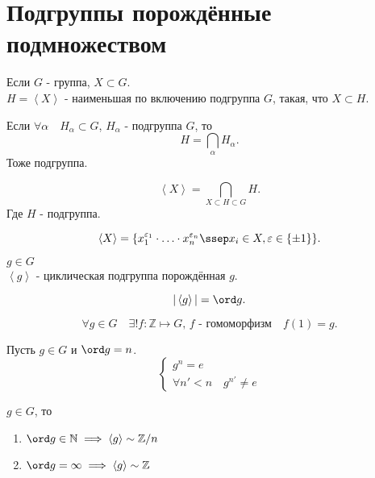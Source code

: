 \documentclass[11pt, oneside]{article}   	%
\begin{document}
\section{Подгруппы порождённые подмножеством}
    \begin{definition}
        Если $G$ - группа, $X \subset G$.\\
        $H = \left<X\right>$ - наименьшая по включению подгруппа $G$, такая, что $X \subset H$. 
    \end{definition}
    \begin{dlemma}
        Если $\forall{\alpha}\quad H_{\alpha} \subset G$, $H_{\alpha}$ - подгруппа $G$, то 
        \[ H = \bigcap_{\alpha} H_{\alpha}  .\]
        Тоже подгруппа.
    \end{dlemma}
    \begin{dlemma}
        \[ \left<X\right> = \bigcap_{X \subset H \subset G} H .\]
        Где $H$ - подгруппа.
    \end{dlemma}
    \begin{dlemma}
        \[ \left<X\right> = \{x_1^{\varepsilon_1} \cdot \ldots \cdot x_n^{\varepsilon_n}\ssep x_i\in X, \varepsilon\in \{\pm 1\} \}  .\]
    \end{dlemma}
    \begin{definition}
        $g\in G$\\
        $\left<g\right>$ - циклическая подгруппа порождённая $g$.
    \end{definition}
    \begin{definition}
    \[ |\left<g\right>| = \ord g .\] 
    \end{definition}
    \begin{dlemma}
        \[ \forall{g\in G}\quad \exists!{f: \mathbb{Z} \mapsto G \text{, $f$ - гомоморфизм}}\quad f(1) = g .\] 
    \end{dlemma}
    \begin{dlemma}
        Пусть $g\in G$ и $\ord g = n$.\\
        \begin{equation*}
            \begin{cases}
                g^{n} = e\\
                \forall{n' < n}\quad g^{n'} \neq e
            \end{cases}
        \end{equation*}
    \end{dlemma}
    \begin{theorem}
        $g\in G$, то
        \begin{enumerate}
            \item $\ord g\in \mathbb{N} \implies \left<g\right> \sim \mathbb{Z}/n$
            \item $\ord g = \infty \implies \left<g\right> \sim \mathbb{Z}$
        \end{enumerate}
    \end{theorem}
\end{document}

